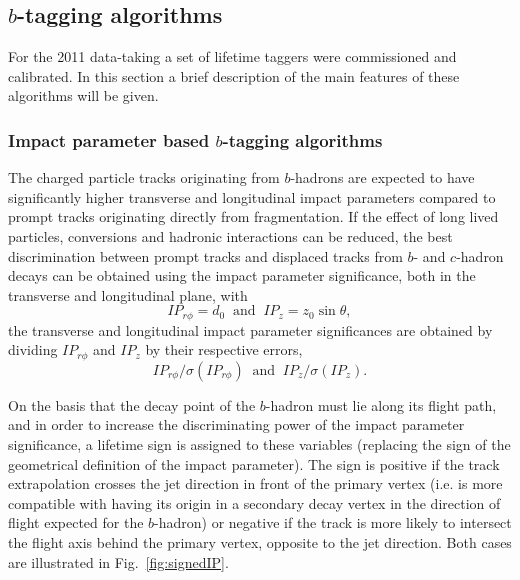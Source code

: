\subsection{$b$-tagging algorithms}

For the 2011 data-taking a set of lifetime taggers were commissioned and calibrated. In this section a brief description of the main features of these algorithms will be given. 

\subsubsection{Impact parameter based $b$-tagging algorithms }


The charged particle tracks originating from $b$-hadrons are expected to have significantly higher transverse and longitudinal impact parameters compared to prompt tracks originating directly from fragmentation. If the effect of long lived particles, conversions and hadronic interactions can be reduced, the best discrimination between prompt tracks and displaced tracks from $b$- and $c$-hadron decays can be obtained using the impact parameter significance, both in the transverse and longitudinal plane, with
%
\begin{equation}
    IP_{r\phi} = d_0\;\;  \mbox{and} \;\;  IP_{z} = z_0 \sin \theta,
\end{equation}
%
the transverse and longitudinal impact parameter significances are obtained by dividing $IP_{r\phi}$ and $IP_z$ by their respective errors,
\begin{equation}
    IP_{r\phi}/\sigma(IP_{r\phi})\;\; \mbox{and} \;\;  IP_{z}/\sigma(IP_{z}).
\end{equation}
%

On the basis that the decay point of the $b$-hadron must lie along its flight path, and in order to increase the discriminating power of the impact parameter significance, a lifetime sign is assigned to these variables (replacing the sign of the geometrical definition of the impact parameter). The sign is positive if the track extrapolation crosses the jet direction in front of the primary vertex (i.e. is more compatible with having its origin in a secondary decay vertex in the direction of flight expected for the $b$-hadron) or negative if the track is more likely to intersect the flight axis behind the primary vertex, opposite to the jet direction. Both cases are illustrated in Fig.~\ref{fig:signedIP}. 

